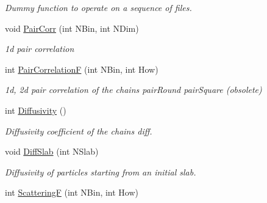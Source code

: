 \begin{DoxyCompactItemize}
\begin{DoxyCompactList}\small\item\em Dummy function to operate on a sequence of files. \end{DoxyCompactList}\item 
void \hyperlink{classElPoly_a56b4b9780b4f84eb1713ca48b49fbbb2}{Pair\+Corr} (int N\+Bin, int N\+Dim)\hypertarget{classElPoly_a56b4b9780b4f84eb1713ca48b49fbbb2}{}\label{classElPoly_a56b4b9780b4f84eb1713ca48b49fbbb2}

\begin{DoxyCompactList}\small\item\em 1d pair correlation \end{DoxyCompactList}\item 
int \hyperlink{classElPoly_a7a3305d9ff38757faf367ced9abf89f0}{Pair\+CorrelationF} (int N\+Bin, int How)\hypertarget{classElPoly_a7a3305d9ff38757faf367ced9abf89f0}{}\label{classElPoly_a7a3305d9ff38757faf367ced9abf89f0}

\begin{DoxyCompactList}\small\item\em 1d, 2d pair correlation of the chains  pair\+Round pair\+Square (obsolete) \end{DoxyCompactList}\item 
int \hyperlink{classElPoly_a2f4aa8dc1e4dce0dc8fcb1d4b161757b}{Diffusivity} ()\hypertarget{classElPoly_a2f4aa8dc1e4dce0dc8fcb1d4b161757b}{}\label{classElPoly_a2f4aa8dc1e4dce0dc8fcb1d4b161757b}

\begin{DoxyCompactList}\small\item\em Diffusivity coefficient of the chains  diff. \end{DoxyCompactList}\item 
void \hyperlink{classElPoly_abf879a7d0b86a5eed8a5be87dc741200}{Diff\+Slab} (int N\+Slab)\hypertarget{classElPoly_abf879a7d0b86a5eed8a5be87dc741200}{}\label{classElPoly_abf879a7d0b86a5eed8a5be87dc741200}

\begin{DoxyCompactList}\small\item\em Diffusivity of particles starting from an initial slab. \end{DoxyCompactList}\item 
int \hyperlink{classElPoly_a1aa4889418bf8c589875e1c77b5262d2}{ScatteringF} (int N\+Bin, int How)\hypertarget{classElPoly_a1aa4889418bf8c589875e1c77b5262d2}{}\label{classElPoly_a1aa4889418bf8c589875e1c77b5262d2}


\end{DoxyCompactItemize}
